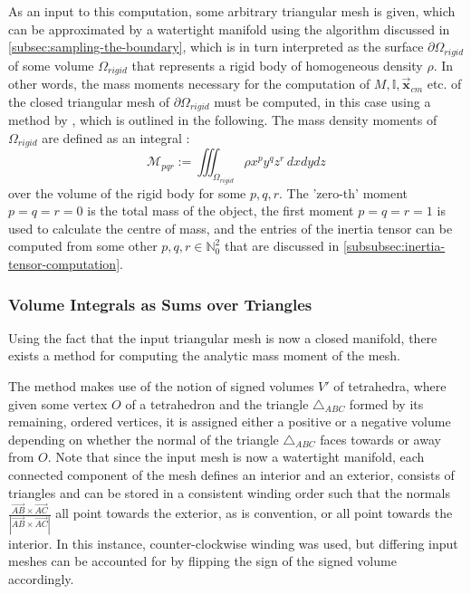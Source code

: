 \documentclass[oneside, a4paper]{book}
\newcommand\abs[1]{\left|#1\right|}
\newcommand\vek[1]{\vec{\bm{#1}}}
\begin{document}
  As an input to this computation, some arbitrary triangular mesh is given, which can be approximated by a watertight manifold using the algorithm discussed in \autoref{subsec:sampling-the-boundary}, which is in turn interpreted as the surface $\partial\Omega_{rigid}$ of some volume $\Omega_{rigid}$ that represents a rigid body of homogeneous density $\rho$. In other words, the mass moments necessary for the computation of $M,\mathds{I},\vek{x}_{cm}$ etc. of the closed triangular mesh of $\partial\Omega_{rigid}$ must be computed, in this case using a method by \autocite[Zhang and Chen]{efficient-feature-extraction}, which is outlined in the following. The mass density moments of $\Omega_{rigid}$ are defined as an integral \autocite{efficient-feature-extraction}:
  \begin{equation}\label{eq:mass-density-moments}
    \mathcal{M}_{pqr} := \iiint_{\Omega_{rigid}} \rho x^p y^q z^r  \, dxdydz
  \end{equation}
  over the volume of the rigid body for some $p,q,r$. The 'zero-th' moment $p=q=r=0$ is the total mass of the object, the first moment $p=q=r=1$ is used to calculate the centre of mass, and the entries of the inertia tensor can be computed from some other $p,q,r \in \mathds{N}_0^2$ that are discussed in \autoref{subsubsec:inertia-tensor-computation}.

  \subsubsection{Volume Integrals as Sums over Triangles}
  
  Using the fact that the input triangular mesh is now a closed manifold, there exists a method for computing the analytic mass moment of the mesh. 
  
  The method makes use of the notion of signed volumes $V'$ of tetrahedra, where given some vertex $O$ of a tetrahedron and the triangle $\triangle_{ABC}$ formed by its remaining, ordered vertices, it is assigned either a positive or a negative volume depending on whether the normal of the triangle $\triangle_{ABC}$ faces towards or away from $O$. Note that since the input mesh is now a watertight manifold, each connected component of the mesh defines an interior and an exterior, consists of triangles and can be stored in a consistent winding order such that the normals $\frac{\overrightarrow{AB} \times \overrightarrow{AC}}{\abs{\overrightarrow{AB} \times \overrightarrow{AC}}}$ all point towards the exterior, as is convention, or all point towards the interior. In this instance, counter-clockwise winding was used, but differing input meshes can be accounted for by flipping the sign of the signed volume accordingly.
  
\end{document}
